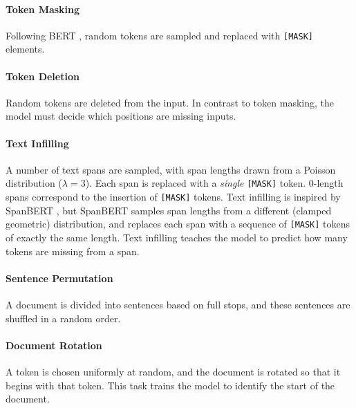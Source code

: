 \documentclass{article} %
\begin{document}
\paragraph{Token Masking} Following BERT \cite{bert}, random tokens are sampled and replaced with \texttt{[MASK]} elements.

\paragraph{Token Deletion} Random tokens are deleted from the input. In contrast to token masking, the model must decide which positions are missing inputs.

\paragraph{Text Infilling} A number of text spans are sampled, with span lengths drawn from a Poisson distribution ($\lambda=3$). Each span is replaced with a \emph{single} \texttt{[MASK]} token. 0-length spans correspond to the insertion of \texttt{[MASK]} tokens.
Text infilling is inspired by SpanBERT \cite{spanbert}, but SpanBERT samples span lengths from a different  (clamped geometric) distribution, and replaces each span with a sequence of \texttt{[MASK]} tokens of exactly the same length. Text infilling teaches the model to predict how many tokens are missing from a span.

\paragraph{Sentence Permutation} A document is divided into sentences based on full stops, and these sentences are shuffled in a random order.

\paragraph{Document Rotation} A token is chosen uniformly at random, and the document is rotated so that it begins with that token. This task trains the model to identify the start of the document.
\end{document}
